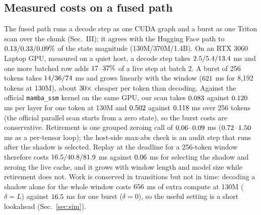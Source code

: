 \documentclass[conference]{IEEEtran}
\begin{document}
\subsection{Measured costs on a fused path}\label{sec:fused}
The fused path runs a decode step as one CUDA graph and a burst as one Triton scan over the chunk (Sec.~III); it agrees with the
Hugging Face path to $0.13/0.33/0.09\%$ of the state magnitude (130M/370M/1.4B). On an RTX 3060 Laptop
GPU, measured on a quiet host, a decode step takes $2.5/5.4/13.4$ ms and one more batched row adds
$17$--$37\%$ of a live step at batch 2. A burst of 256 tokens takes $14/36/74$ ms and
grows linearly with the window ($621$ ms for 8{,}192 tokens at 130M), about $30\times$ cheaper per token than
decoding. Against the official \texttt{mamba\_ssm} kernel on the same GPU, our scan takes $0.083$ against $0.120$ ms per layer for one token at 130M and $0.502$ against $0.118$ ms over 256 tokens (the official parallel scan starts from a zero state), so the burst costs are conservative. Retirement is one grouped zeroing call of $0.06$--$0.09$ ms ($0.72$--$1.50$ ms as a per-tensor
loop); the host-side max-abs check is an audit step that runs after the shadow is selected.
Replay at the deadline for a 256-token window therefore costs $16.5/40.8/81.9$ ms against $0.06$ ms for
selecting the shadow and zeroing the live cache, and it grows with window length and model size while retirement does not. Work
is conserved in transitions but not in time: decoding a shadow alone for the whole window costs $656$ ms of extra compute
at 130M ($\delta{=}L$) against $16.5$ ms for one burst ($\delta{=}0$), so the useful setting is a short lookahead (Sec.~\ref{sec:sim}).
\end{document}
